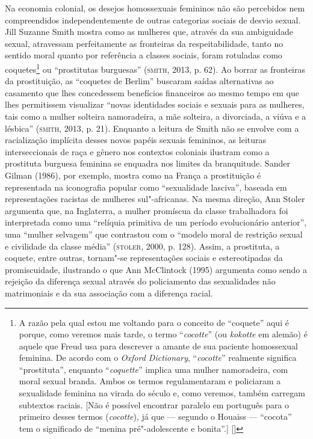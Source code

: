 Na economia colonial, os desejos homossexuais femininos não são
percebidos nem compreendidos independentemente de outras categorias
sociais de desvio sexual. Jill Suzanne Smith mostra como as mulheres
que, através da sua ambiguidade sexual, atravessam perfeitamente as
fronteiras da respeitabilidade, tanto no sentido moral quanto por
referência a classes sociais, foram rotuladas como coquetes\footnote{A
  razão pela qual estou me voltando para o conceito de ``coquete'' aqui é
  porque, como veremos mais tarde, o termo ``\emph{cocotte}'' (ou
  \emph{kokotte} em alemão) é aquele que Freud usa para descrever a
  amante de sua paciente homossexual feminina. De acordo com o
  \emph{Oxford Dictionary}, ``\emph{cocotte}'' realmente significa
  ``prostituta'', enquanto ``\emph{coquette}'' implica uma mulher
  namoradeira, com moral sexual branda. Ambos os termos regulamentaram e
  policiaram a sexualidade feminina na virada do século e, como veremos,
  também carregam subtextos raciais. {[}Não é possível encontrar
  paralelo em português para o primeiro desses termos (\emph{cocotte}),
  já que --- segundo o Houaiss --- ``cocota'' tem o significado de
  ``menina pré"-adolescente e bonita''.{]} []} ou ``prostitutas
    burguesas'' (\textsc{smith}, 2013, p. 62). Ao borrar as fronteiras da prostituição, as
``coquetes de Berlim'' buscaram saídas alternativas ao casamento que lhes
concedessem benefícios financeiros ao mesmo tempo em que lhes
permitissem visualizar ``novas identidades sociais e sexuais para as
mulheres, tais como a mulher solteira namoradeira, a mãe solteira, a
divorciada, a viúva e a lésbica'' (\textsc{smith}, 2013, p. 21). Enquanto a leitura de
Smith não se envolve com a racialização implícita desses novos papéis
sexuais femininos, as leituras interseccionais de raça e gênero nos
contextos coloniais ilustram como a prostituta burguesa feminina se
enquadra nos limites da branquitude. Sander Gilman (1986), por exemplo, mostra
como na França a prostituição é representada na iconografia popular como
``sexualidade lasciva'', baseada em representações racistas de mulheres
sul"-africanas. Na mesma direção, Ann Stoler argumenta que,
na Inglaterra, a mulher promíscua da classe trabalhadora foi
interpretada como uma ``relíquia primitiva de um período evolucionário
anterior'', uma ``mulher selvagem'' que contrastou com o ``modelo
moral de restrição sexual e civilidade da classe média'' (\textsc{stoler}, 2000,
p. 128). Assim, a prostituta, a coquete, entre outras, tornam"-se
representações sociais e estereotipadas da promiscuidade, ilustrando o
que Ann McClintock (1995) argumenta como sendo a rejeição da diferença sexual
através do policiamento das sexualidades não matrimoniais e da sua
associação com a diferença racial.

